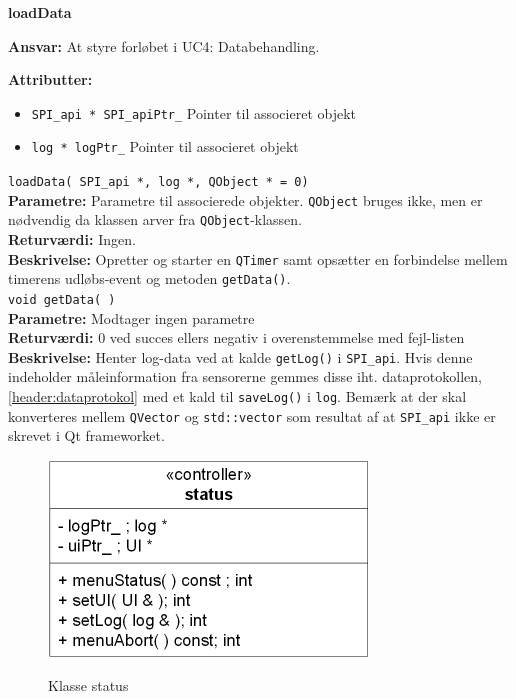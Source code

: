{\centering
\textbf{loadData}\par
}
\textbf{Ansvar:} At styre forløbet i UC4: Databehandling. \

\textbf{Attributter:}
\begin{itemize}
	\item \verb+SPI_api * SPI_apiPtr_+ Pointer til associeret objekt
	\item \verb+log * logPtr_+ Pointer til associeret objekt
\end{itemize}

\verb+loadData( SPI_api *, log *, QObject * = 0)+ \\
\textbf{Parametre:} Parametre til associerede objekter. \verb+QObject+ bruges ikke, men er nødvendig da klassen arver fra \verb+QObject+-klassen. \\
\textbf{Returværdi:} Ingen. \\
\textbf{Beskrivelse:} Opretter og starter en \verb+QTimer+ samt opsætter en forbindelse mellem timerens udløbs-event og metoden \verb+getData()+. \\

\verb+void getData( )+ \\
\textbf{Parametre:} Modtager ingen parametre \\
\textbf{Returværdi:} 0 ved succes ellers negativ i overenstemmelse med fejl-listen \\
\textbf{Beskrivelse:} Henter log-data ved at kalde \verb+getLog()+ i \verb+SPI_api+. Hvis denne indeholder måleinformation fra sensorerne gemmes disse iht. dataprotokollen, \ref{header:dataprotokol} med et kald til \verb+saveLog()+ i \verb+log+. Bemærk at der skal konverteres mellem \verb+QVector+ og \verb+std::vector+ som resultat af at \verb+SPI_api+ ikke er skrevet i Qt frameworket.\\

\begin{figure}[htbp] \centering
{\includegraphics[scale=1.5]{filer/design/Klassediagrammer/sw_status}}
\caption{Klasse status}
\label{fig:status klassediagram}
\end{figure} 

